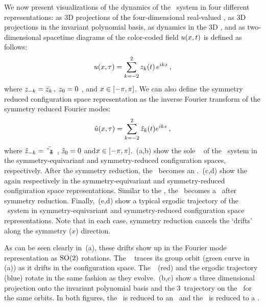 We now present visualizations of the dynamics of the \twomode\ system in
four different representations: as 3D projections of the four-dimensional
real-valued \statesp, as 3D projections in the invariant polynomial
basis, as dynamics in the 3D \slicePlane, and as two-dimensional
spacetime diagrams of the color-coded field
$u(x,t)$
is defined as follows:
\[
	u(x, \tau) = \sum_{k=-2}^{2} z_k(t) \, e^{i k x}
\,,
\]
where $z_{-k} = \bar{z_k} \,, \; 	z_0 = 0$ ,  and $x
\in [- \pi, \pi]$. We can also define the symmetry reduced configuration
space representation as the inverse Fourier transform of the symmetry
reduced Fourier modes:
\[
	\hat{u}(x, \tau) = \sum_{k=-2}^{2} \hat{z}_k(t) e^{i k x}
\,,
\]
where $\hat{z}_{-k} = \bar{\hat{z}_k}$ \,, \; 	$\hat{z}_0 = 0$ \;
and$x \in [- \pi, \pi]$. \,(a,b) show the
sole \reqv\ \REQV{}{} of the \twomode\ system in the symmetry-equivariant
and symmetry-reduced configuration spaces, respectively. After the
symmetry reduction, the \reqv\ becomes an \eqv.
\,(c,d) show the \rpo\  again
respectively in the symmetry-equivariant and symmetry-reduced
configuration space representations. Similar to the \reqv, the \rpo\
becomes a \po\ after symmetry reduction. Finally,
\,(e,d) show a typical ergodic trajectory of the
\twomode\ system in symmetry-equivariant and symmetry-reduced
configuration space representations. Note that in each case, symmetry
reduction cancels the `drifts' along the symmetry ($x$) direction.

As can be seen clearly in \,(a), these drifts show up in
the Fourier mode representation as $$ rotations. The \reqv\ \REQV{}{}
traces its \SOn{2} group orbit (green curve in \reffig{fig:2modes-ssp}\,(a))
as it drifts in the configuration space. The
\rpo\ \,(red) and the ergodic trajectory (blue) rotate
in the same fashion as they evolve. \refFig{fig:2modes-ssp}\,(b,c)
show a three dimensional projection onto the invariant polynomial basis and the 3\dmn\
trajectory on the \slicePlane\ for the same orbits. In both figures, the \reqv\ is reduced
to an \eqv\ and the \rpo\ is reduced to a \po.
